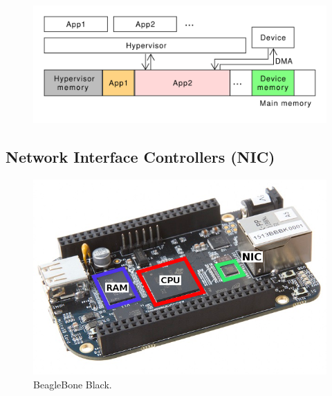 \documentclass{beamer}
\begin{document}
\begin{frame}
    \begin{center}
        \begin{figure}
            \includegraphics[width=\textwidth]{figures/dma-hyp-apps-bad.pdf}
            \label{dma-dangers-2}
        \end{figure}
    \end{center}
\end{frame}

\subsection{Network Interface Controllers (NIC)}

\begin{frame}
    \begin{figure}
        \includegraphics[]{figures/BBB_cpu_ram_nic.png}
        \caption{BeagleBone Black.}
        \label{bbb_nic}
    \end{figure}
\end{frame}
\end{document}
